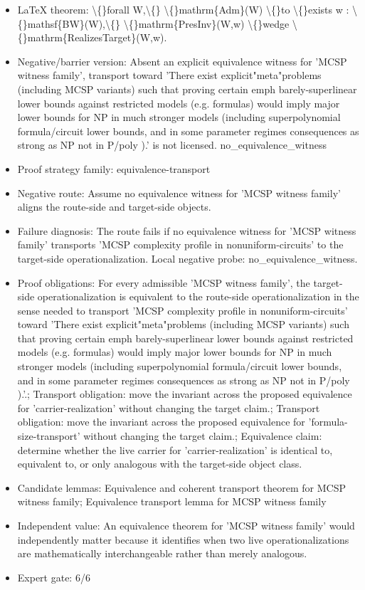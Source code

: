 \documentclass[11pt]{article}
\begin{document}
\begin{itemize}
\item LaTeX theorem: \textbackslash\{\}forall W,\textbackslash\{\} \textbackslash\{\}mathrm\{Adm\}(W) \textbackslash\{\}to \textbackslash\{\}exists w : \textbackslash\{\}mathsf\{BW\}(W),\textbackslash\{\} \textbackslash\{\}mathrm\{PresInv\}(W,w) \textbackslash\{\}wedge \textbackslash\{\}mathrm\{RealizesTarget\}(W,w).
\item Negative/barrier version: Absent an explicit equivalence witness for 'MCSP witness family', transport toward 'There exist explicit"meta"problems (including MCSP variants) such that proving certain emph barely-superlinear lower bounds against restricted models (e.g. formulas) would imply major lower bounds for NP in much stronger models (including superpolynomial formula/circuit lower bounds, and in some parameter regimes consequences as strong as NP not in P/poly ).' is not licensed. no\_equivalence\_witness
\item Proof strategy family: equivalence-transport
\item Negative route: Assume no equivalence witness for 'MCSP witness family' aligns the route-side and target-side objects.
\item Failure diagnosis: The route fails if no equivalence witness for 'MCSP witness family' transports 'MCSP complexity profile in nonuniform-circuits' to the target-side operationalization. Local negative probe: no\_equivalence\_witness.
\item Proof obligations: For every admissible 'MCSP witness family', the target-side operationalization is equivalent to the route-side operationalization in the sense needed to transport 'MCSP complexity profile in nonuniform-circuits' toward 'There exist explicit"meta"problems (including MCSP variants) such that proving certain emph barely-superlinear lower bounds against restricted models (e.g. formulas) would imply major lower bounds for NP in much stronger models (including superpolynomial formula/circuit lower bounds, and in some parameter regimes consequences as strong as NP not in P/poly ).'.; Transport obligation: move the invariant across the proposed equivalence for 'carrier-realization' without changing the target claim.; Transport obligation: move the invariant across the proposed equivalence for 'formula-size-transport' without changing the target claim.; Equivalence claim: determine whether the live carrier for 'carrier-realization' is identical to, equivalent to, or only analogous with the target-side object class.
\item Candidate lemmas: Equivalence and coherent transport theorem for MCSP witness family; Equivalence transport lemma for MCSP witness family
\item Independent value: An equivalence theorem for 'MCSP witness family' would independently matter because it identifies when two live operationalizations are mathematically interchangeable rather than merely analogous.
\item Expert gate: 6/6
\end{itemize}
\end{document}
